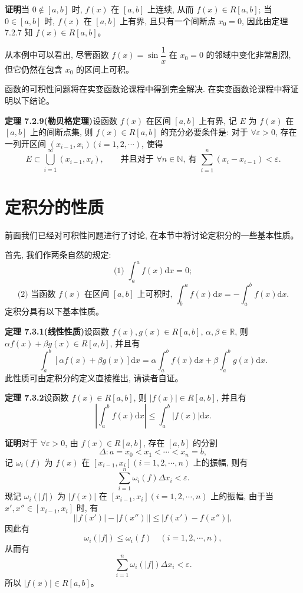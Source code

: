 \documentclass[UTF8,12pt,a4paper,fontset=fandol]{ctexart}
\begin{document}
\noindent\textbf{证明}\quad 当 $0\notin[a,b]$ 时, $f(x)$ 在 $[a,b]$ 上连续, 从而 $f(x)\in R[a,b]$; 当 $0\in[a,b]$ 时, $f(x)$ 在 $[a,b]$ 上有界, 且只有一个间断点 $x_0=0$, 因此由定理 7.2.7 知 $f(x)\in R[a,b]$。

从本例中可以看出, 尽管函数 $f(x)=\sin\dfrac{1}{x}$ 在 $x_0=0$ 的邻域中变化非常剧烈, 但它仍然在包含 $x_0$ 的区间上可积。

函数的可积性问题将在实变函数论课程中得到完全解决. 在实变函数论课程中将证明以下结论。

\noindent\textbf{定理 7.2.9(勒贝格定理)}\quad 设函数 $f(x)$ 在区间 $[a,b]$ 上有界, 记 $E$ 为 $f(x)$ 在 $[a,b]$ 上的间断点集, 则 $f(x)\in R[a,b]$ 的充分必要条件是: 对于 $\forall\varepsilon>0$, 存在一列开区间 $(x_{i-1},x_i)(i=1,2,\cdots)$, 使得
\[
  E\subset \bigcup_{i=1}^{\infty}(x_{i-1},x_i),
  \qquad
  \text{并且对于 } \forall n\in\mathbb N,\ \text{有 } \sum_{i=1}^n(x_i-x_{i-1})<\varepsilon.
\]

\section{定积分的性质}

前面我们已经对可积性问题进行了讨论, 在本节中将讨论定积分的一些基本性质。

首先, 我们作两条自然的规定:
\[
  \text{(1) }\int_a^a f(x)\mathrm dx=0;
\]
\[
  \text{(2) 当函数 } f(x) \text{ 在区间 } [a,b] \text{ 上可积时, }
  \int_b^a f(x)\mathrm dx=-\int_a^b f(x)\mathrm dx.
\]
定积分具有以下基本性质。

\noindent\textbf{定理 7.3.1(线性性质)}\quad 设函数 $f(x),g(x)\in R[a,b]$, $\alpha,\beta\in\mathbb R$, 则 $\alpha f(x)+\beta g(x)\in R[a,b]$, 并且有
\[
  \int_a^b[\alpha f(x)+\beta g(x)]\mathrm dx
  =\alpha\int_a^b f(x)\mathrm dx+\beta\int_a^b g(x)\mathrm dx.
\]
此性质可由定积分的定义直接推出, 请读者自证。

\noindent\textbf{定理 7.3.2}\quad 设函数 $f(x)\in R[a,b]$, 则 $|f(x)|\in R[a,b]$, 并且有
\[
  \left|\int_a^b f(x)\mathrm dx\right|\leq \int_a^b |f(x)|\mathrm dx.
\]

\noindent\textbf{证明}\quad 对于 $\forall\varepsilon>0$, 由 $f(x)\in R[a,b]$, 存在 $[a,b]$ 的分割
\[
  \Delta:a=x_0<x_1<\cdots<x_n=b,
\]
记 $\omega_i(f)$ 为 $f(x)$ 在 $[x_{i-1},x_i](i=1,2,\cdots,n)$ 上的振幅, 则有
\[
  \sum_{i=1}^n \omega_i(f)\Delta x_i<\varepsilon.
\]
现记 $\omega_i(|f|)$ 为 $|f(x)|$ 在 $[x_{i-1},x_i](i=1,2,\cdots,n)$ 上的振幅, 由于当 $x',x''\in[x_{i-1},x_i]$ 时, 有
\[
  \bigl||f(x')|-|f(x'')|\bigr|\leq |f(x')-f(x'')|,
\]
因此有
\[
  \omega_i(|f|)\leq \omega_i(f)\quad(i=1,2,\cdots,n),
\]
从而有
\[
  \sum_{i=1}^n \omega_i(|f|)\Delta x_i<\varepsilon.
\]
所以 $|f(x)|\in R[a,b]$。
\end{document}
